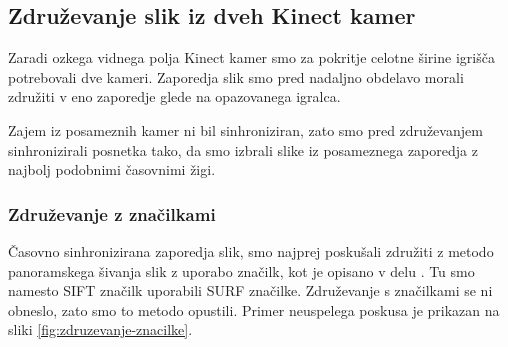 \subsection{Združevanje slik iz dveh Kinect kamer}
Zaradi ozkega vidnega polja Kinect kamer smo za pokritje celotne širine igrišča potrebovali dve kameri. Zaporedja slik smo pred nadaljno obdelavo morali združiti v eno zaporedje glede na opazovanega igralca.

Zajem iz posameznih kamer ni bil sinhroniziran, zato smo pred združevanjem sinhronizirali posnetka tako, da smo izbrali slike iz posameznega zaporedja z najbolj podobnimi časovnimi žigi. 

\subsubsection{Združevanje z značilkami}
Časovno sinhronizirana zaporedja slik, smo najprej poskušali združiti z metodo panoramskega šivanja slik z uporabo značilk, kot je opisano v delu \cite{brown2007automatic}. Tu smo namesto SIFT značilk uporabili SURF značilke. Združevanje s značilkami se ni obneslo, zato smo to metodo opustili. Primer neuspelega poskusa je prikazan na sliki \ref{fig:zdruzevanje-znacilke}.


